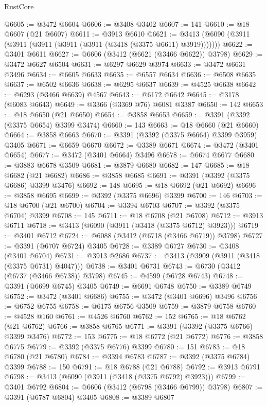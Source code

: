\begin{lexlean}{RustCore}
\begin{coremodule}
@6605 := @3472 @6604
@6606 := @3408 @3402
@6607 := 141
@6610 := @18 @6607 (@21 @6607)
@6611 := @3913 @6610
@6621 := @3413 (@6090 (@3911 (@3911 (@3911 (@3911 (@3911 (@3418 (@3375 @6611) @3919)))))))
@6622 := @3401 @6611
@6627 := @6606 (@3412 (@6621 (@3466 @6622)) @3798)
@6629 := @3472 @6627 @6504
@6631 := @6297 @6629 @3974
@6633 := @3472 @6631 @3496
@6634 := @6605 @6633
@6635 := @6557 @6634
@6636 := @6508 @6635
@6637 := @6502 @6636
@6638 := @6295 @6637
@6639 := @4525 @6638
@6642 := @6293 (@3466 @6639) @4567
@6643 := @6172 @6642
@6645 := @3178 (@6083 @6643)
@6649 := @3366 (@3369 @76) @6081 @3387
@6650 := 142
@6653 := @18 @6650 (@21 @6650)
@6654 := @3858 @6653
@6659 := @3391 (@3392 (@3375 @6654) @3399 @3474)
@6660 := 143
@6663 := @18 @6660 (@21 @6660)
@6664 := @3858 @6663
@6670 := @3391 (@3392 (@3375 @6664) @3399 @3959) @3405
@6671 := @6659 @6670
@6672 := @3389 @6671
@6674 := @3472 (@3401 @6654)
@6677 := @3472 (@3401 @6664) @3496
@6678 := @6674 @6677
@6680 := @3883 @6678 @3509
@6681 := @3879 @6680
@6682 := 147
@6685 := @18 @6682 (@21 @6682)
@6686 := @3858 @6685
@6691 := @3391 (@3392 (@3375 @6686) @3399 @3476)
@6692 := 148
@6695 := @18 @6692 (@21 @6692)
@6696 := @3858 @6695
@6699 := @3392 (@3375 @6696) @3399
@6700 := 146
@6703 := @18 @6700 (@21 @6700)
@6704 := @3394 @6703
@6707 := @3392 (@3375 @6704) @3399
@6708 := 145
@6711 := @18 @6708 (@21 @6708)
@6712 := @3913 @6711
@6718 := @3413 (@6090 (@3911 (@3418 (@3375 @6712) @3923)))
@6719 := @3401 @6712
@6724 := @6088 (@3412 (@6718 (@3466 @6719)) @3798)
@6727 := @3391 (@6707 @6724) @3405
@6728 := @3389 @6727
@6730 := @3408 (@3401 @6704)
@6731 := @3913 @2686
@6737 := @3413 (@3909 (@3911 (@3418 (@3375 @6731) @4047)))
@6738 := @3401 @6731
@6743 := @6730 (@3412 (@6737 (@3466 @6738)) @3798)
@6745 := @4599 (@6728 @6743)
@6748 := @3391 (@6699 @6745) @3405
@6749 := @6691 @6748
@6750 := @3389 @6749
@6752 := @3472 (@3401 @6686)
@6755 := @3472 (@3401 @6696) @3496
@6756 := @6752 @6755
@6758 := @6175 @6756 @3509
@6759 := @3879 @6758
@6760 := @4528 @160
@6761 := @4526 @6760
@6762 := 152
@6765 := @18 @6762 (@21 @6762)
@6766 := @3858 @6765
@6771 := @3391 (@3392 (@3375 @6766) @3399 @3476)
@6772 := 153
@6775 := @18 @6772 (@21 @6772)
@6776 := @3858 @6775
@6779 := @3392 (@3375 @6776) @3399
@6780 := 151
@6783 := @18 @6780 (@21 @6780)
@6784 := @3394 @6783
@6787 := @3392 (@3375 @6784) @3399
@6788 := 150
@6791 := @18 @6788 (@21 @6788)
@6792 := @3913 @6791
@6798 := @3413 (@6090 (@3911 (@3418 (@3375 @6792) @3923)))
@6799 := @3401 @6792
@6804 := @6606 (@3412 (@6798 (@3466 @6799)) @3798)
@6807 := @3391 (@6787 @6804) @3405
@6808 := @3389 @6807

\end{coremodule}
\end{lexlean}
